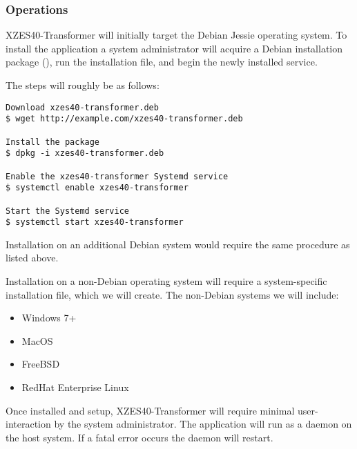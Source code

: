 \subsubsection{Operations}

XZES40-Transformer will initially target the Debian Jessie operating system.
To install the application a system administrator will acquire a Debian installation package (), run the installation file, and begin the newly installed service.

The steps will roughly be as follows:
\begin{lstlisting}
Download xzes40-transformer.deb
$ wget http://example.com/xzes40-transformer.deb

Install the package
$ dpkg -i xzes40-transformer.deb

Enable the xzes40-transformer Systemd service
$ systemctl enable xzes40-transformer

Start the Systemd service
$ systemctl start xzes40-transformer
\end{lstlisting}

Installation on an additional Debian system would require the same procedure as listed above.

Installation on a non-Debian operating system will require a system-specific installation file, which we will create.
The non-Debian systems we will include:
\begin{itemize}
  \item Windows 7+
  \item MacOS
  \item FreeBSD
  \item RedHat Enterprise Linux
\end{itemize}

Once installed and setup, XZES40-Transformer will require minimal user-interaction by the system administrator.
The application will run as a daemon on the host system.
If a fatal error occurs the daemon will restart.

